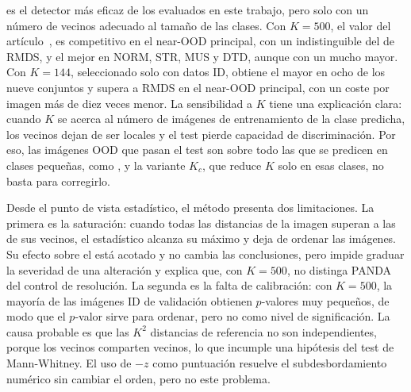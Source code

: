 \stoodx es el detector más eficaz de los evaluados en este trabajo, pero solo con un número de vecinos adecuado al tamaño de las clases. Con $K = 500$, el valor del artículo~\cite{sevillano2026}, es competitivo en el near-OOD principal, con un \AUROC indistinguible del de RMDS, y el mejor en NORM, STR, MUS y DTD, aunque con un  mucho mayor. Con $K = 144$, seleccionado solo con datos ID, obtiene el mayor \AUROC en ocho de los nueve conjuntos y supera a RMDS en el near-OOD principal, con un coste por imagen más de diez veces menor. La sensibilidad a $K$ tiene una explicación clara: cuando $K$ se acerca al número de imágenes de entrenamiento de la clase predicha, los vecinos dejan de ser locales y el test pierde capacidad de discriminación. Por eso, las imágenes OOD que pasan el test son sobre todo las que se predicen en clases pequeñas, como , y la variante $K_c$, que reduce $K$ solo en esas clases, no basta para corregirlo.

Desde el punto de vista estadístico, el método presenta dos limitaciones. La primera es la saturación: cuando todas las distancias de la imagen superan a las de sus vecinos, el estadístico alcanza su máximo y deja de ordenar las imágenes. Su efecto sobre el \AUROC está acotado y no cambia las conclusiones, pero impide graduar la severidad de una alteración y explica que, con $K = 500$, \stoodx no distinga PANDA del control de resolución. La segunda es la falta de calibración: con $K = 500$, la mayoría de las imágenes ID de validación obtienen $p$-valores muy pequeños, de modo que el $p$-valor sirve para ordenar, pero no como nivel de significación. La causa probable es que las $K^2$ distancias de referencia no son independientes, porque los vecinos comparten vecinos, lo que incumple una hipótesis del test de Mann-Whitney. El uso de $-z$ como puntuación resuelve el subdesbordamiento numérico sin cambiar el orden, pero no este problema.

